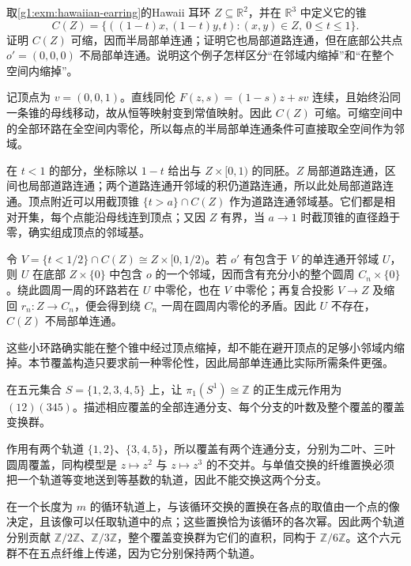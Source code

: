 \begin{exercise}\label{g1:ex:earring-cone-semilocal}
	取\cref{g1:exm:hawaiian-earring}的Hawaii 耳环 \(Z\subseteq\mathbb R^2\)，并在 \(\mathbb R^3\) 中定义它的锥
	\[
		C(Z)=\{((1-t)x,(1-t)y,t):(x,y)\in Z,\ 0\le t\le1\}.
	\]
	证明 \(C(Z)\) 可缩，因而半局部单连通；证明它也局部道路连通，但在底部公共点 \(o'=(0,0,0)\) 不局部单连通。说明这个例子怎样区分“在邻域内缩掉”和“在整个空间内缩掉”。
\end{exercise}
\begin{solution}
	记顶点为 \(v=(0,0,1)\)。直线同伦 \(F(z,s)=(1-s)z+sv\) 连续，且始终沿同一条锥的母线移动，故从恒等映射变到常值映射。因此 \(C(Z)\) 可缩。可缩空间中的全部环路在全空间内零伦，所以每点的半局部单连通条件可直接取全空间作为邻域。

	在 \(t<1\) 的部分，坐标除以 \(1-t\) 给出与 \(Z\times[0,1)\) 的同胚。\(Z\) 局部道路连通，区间也局部道路连通；两个道路连通开邻域的积仍道路连通，所以此处局部道路连通。顶点附近可以用截顶锥 \(\{t>a\}\cap C(Z)\) 作为道路连通邻域基。它们都是相对开集，每个点能沿母线连到顶点；又因 \(Z\) 有界，当 \(a\to1\) 时截顶锥的直径趋于零，确实组成顶点的邻域基。

	令 \(V=\{t<1/2\}\cap C(Z)\cong Z\times[0,1/2)\)。若 \(o'\) 有包含于 \(V\) 的单连通开邻域 \(U\)，则 \(U\) 在底部 \(Z\times\{0\}\) 中包含 \(o\) 的一个邻域，因而含有充分小的整个圆周 \(C_n\times\{0\}\)。绕此圆周一周的环路若在 \(U\) 中零伦，也在 \(V\) 中零伦；再复合投影 \(V\to Z\) 及缩回 \(r_n:Z\to C_n\)，便会得到绕 \(C_n\) 一周在圆周内零伦的矛盾。因此 \(U\) 不存在，\(C(Z)\) 不局部单连通。

	这些小环路确实能在整个锥中经过顶点缩掉，却不能在避开顶点的足够小邻域内缩掉。本节覆盖构造只要求前一种零伦性，因此局部单连通比实际所需条件更强。
\end{solution}

\begin{exercise}\label{g1:ex:two-orbit-circle-monodromy}
	在五元集合 \(S=\{1,2,3,4,5\}\) 上，让 \(\pi_1(S^1)\cong\mathbb Z\) 的正生成元作用为 \((12)(345)\)。描述相应覆盖的全部连通分支、每个分支的叶数及整个覆盖的覆盖变换群。
\end{exercise}
\begin{solution}
	作用有两个轨道 \(\{1,2\}\)、\(\{3,4,5\}\)，所以覆盖有两个连通分支，分别为二叶、三叶圆周覆盖，同构模型是 \(z\mapsto z^2\) 与 \(z\mapsto z^3\) 的不交并。与单值交换的纤维置换必须把一个轨道等变地送到等基数的轨道，因此不能交换这两个分支。

	在一个长度为 \(m\) 的循环轨道上，与该循环交换的置换在各点的取值由一个点的像决定，且该像可以任取轨道中的点；这些置换恰为该循环的各次幂。因此两个轨道分别贡献 \(\mathbb Z/2\mathbb Z\)、\(\mathbb Z/3\mathbb Z\)，整个覆盖变换群为它们的直积，同构于 \(\mathbb Z/6\mathbb Z\)。这个六元群不在五点纤维上传递，因为它分别保持两个轨道。
\end{solution}

